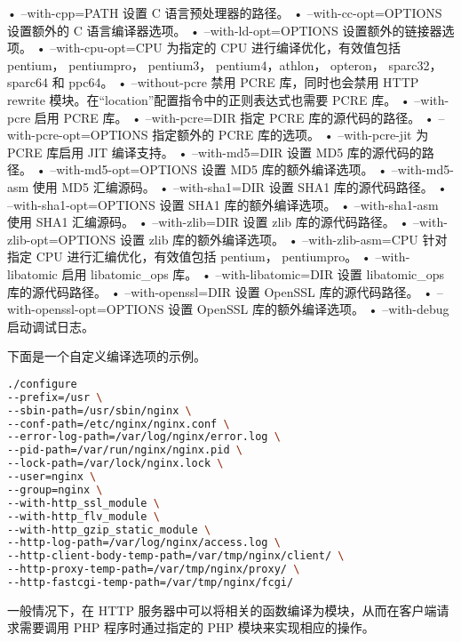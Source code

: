 \begin{compactitem}
• --with-cpp=PATH
设置 C 语言预处理器的路径。
• --with-cc-opt=OPTIONS
设置额外的 C 语言编译器选项。
• --with-ld-opt=OPTIONS
设置额外的链接器选项。
• --with-cpu-opt=CPU
为指定的 CPU 进行编译优化，有效值包括 pentium， pentiumpro， pentium3， pentium4，athlon， opteron， sparc32， sparc64 和 ppc64。
• --without-pcre
禁用 PCRE 库，同时也会禁用 HTTP rewrite 模块。在“location”配置指令中的正则表达式也需要 PCRE 库。
• --with-pcre
启用 PCRE 库。
• --with-pcre=DIR
指定 PCRE 库的源代码的路径。
• --with-pcre-opt=OPTIONS
指定额外的 PCRE 库的选项。
• --with-pcre-jit
为 PCRE 库启用 JIT 编译支持。
• --with-md5=DIR
设置 MD5 库的源代码的路径。
• --with-md5-opt=OPTIONS
设置 MD5 库的额外编译选项。
• --with-md5-asm
使用 MD5 汇编源码。
• --with-sha1=DIR
设置 SHA1 库的源代码路径。
• --with-sha1-opt=OPTIONS
设置 SHA1 库的额外编译选项。
• --with-sha1-asm
使用 SHA1 汇编源码。
• --with-zlib=DIR
设置 zlib 库的源代码路径。
• --with-zlib-opt=OPTIONS
设置 zlib 库的额外编译选项。
• --with-zlib-asm=CPU
针对指定 CPU 进行汇编优化，有效值包括 pentium， pentiumpro。
• --with-libatomic
启用 libatomic_ops 库。
• --with-libatomic=DIR
设置 libatomic_ops 库的源代码路径。
• --with-openssl=DIR
设置 OpenSSL 库的源代码路径。
• --with-openssl-opt=OPTIONS
设置 OpenSSL 库的额外编译选项。
• --with-debug
启动调试日志。
\end{compactitem}


下面是一个自定义编译选项的示例。

\begin{lstlisting}[language=bash]
./configure
--prefix=/usr \
--sbin-path=/usr/sbin/nginx \
--conf-path=/etc/nginx/nginx.conf \
--error-log-path=/var/log/nginx/error.log \
--pid-path=/var/run/nginx/nginx.pid \
--lock-path=/var/lock/nginx.lock \
--user=nginx \
--group=nginx \
--with-http_ssl_module \
--with-http_flv_module \
--with-http_gzip_static_module \
--http-log-path=/var/log/nginx/access.log \
--http-client-body-temp-path=/var/tmp/nginx/client/ \
--http-proxy-temp-path=/var/tmp/nginx/proxy/ \
--http-fastcgi-temp-path=/var/tmp/nginx/fcgi/
\end{lstlisting}


一般情况下，在 HTTP 服务器中可以将相关的函数编译为模块，从而在客户端请求需要调用 PHP 程序时通过指定的 PHP 模块来实现相应的操作。







\begin{lstlisting}[language=bash]

\end{lstlisting}




